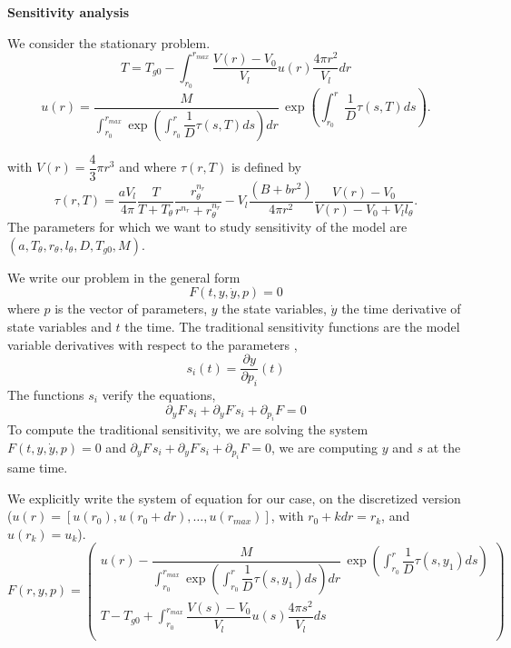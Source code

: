 \documentclass[11pt,a4paper]{article}
\begin{document}
\begin{center}
\large \textbf{Sensitivity analysis}
\end{center}

We consider the stationary problem. 
$$T = T_{g0} - \displaystyle  \int_{r_0}^{r_{max}} \dfrac{V(r) - V_0}{V_l} u(r) \dfrac{4\pi r^2}{V_l} dr$$
$$u(r) = \displaystyle \dfrac{M}{\displaystyle \int_{r_{0}}^{r_{max}} \exp  \left(\displaystyle  \int_{r_{0}}^{r} \dfrac{1}{D} \tau(s, T) ds \right) dr}  \, \exp \left(\displaystyle  \int_{r_{0}}^{r} \dfrac{1}{D} \tau(s, T) ds \right).$$

with $V(r) = \dfrac{4}{3} \pi r^3$ and where $\tau(r, T)$ is defined by 
$$\tau(r, T) = \dfrac{aV_l}{4\pi}  \dfrac{T}{T + T_{\theta}} \dfrac{r_{\theta}^{n_r}}{r^{n_r}+ r_{\theta}^{n_r}} - V_l \dfrac{(B + br^2)}{4\pi r^2} \dfrac{V(r) - V_0}{V(r) - V_0 + V_l  l_{\theta}}.$$
The parameters for which we want to study sensitivity of the model are $(a, T_{\theta}, r_{\theta}, l_{\theta}, D, T_{g0}, M)$. 

We write our problem in the general form
$$F(t, y, \dot{y}, p) = 0$$
where $p$ is the vector of parameters, $y$ the state variables, $\dot{y}$ the time derivative of state variables and $t$ the time. The traditional sensitivity functions are the model variable derivatives with respect to the parameters \citep{thomaseth.1999},
$$s_i(t) = \dfrac{\partial y}{\partial p_i} (t)$$
The functions $s_i$ verify the equations, 
$$\partial_y F \, s_i + \partial_{\dot{y}} F \, \dot{s}_i + \partial_{p_i} F = 0$$
To compute the traditional sensitivity, we are solving the system $F(t, y, \dot{y}, p) = 0$ and $\partial_y F \, s_i + \partial_{\dot{y}} F \, \dot{s}_i + \partial_{p_i} F = 0$, we are computing $y$ and $s$ at the same time. 

We explicitly write the system of equation for our case, on the discretized version ($u(r) = [u(r_0), u(r_0+dr), \dots, u(r_{max})]$, with $r_0 + kdr = r_k$, and $u(r_k) = u_k$). 
$$F(r, y, p) = \begin{pmatrix}
u(r) - \displaystyle \dfrac{M}{\displaystyle \int_{r_{0}}^{r_{max}} \exp  \left(\displaystyle  \int_{r_{0}}^{r} \dfrac{1}{D} \tau(s, y_1) ds \right) dr}  \, \exp \left(\displaystyle  \int_{r_{0}}^{r} \dfrac{1}{D} \tau(s, y_1) ds \right)\\
T - T_{g0} + \displaystyle  \int_{r_0}^{r_{max}} \dfrac{V(s) - V_0}{V_l} u(s) \dfrac{4\pi s^2}{V_l} ds \\

\end{pmatrix} $$
\end{document}
